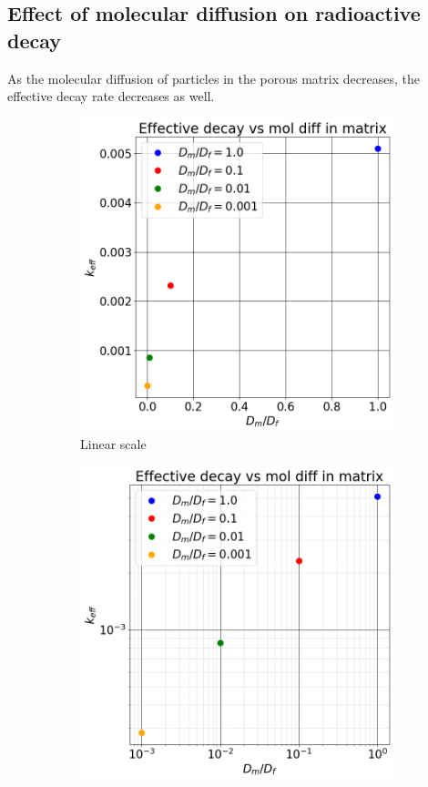 \documentclass{article}
\begin{document}
\FloatBarrier  %
\subsection{Effect of molecular diffusion on radioactive decay}
As the molecular diffusion of particles in the porous matrix decreases, the effective decay rate decreases as well.
\begin{figure}[htbp]
    \centering
    \begin{subfigure}[b]{0.48\textwidth}
        \centering
        \includegraphics[width=\textwidth]{images/kEffVsDfDmRatio.png}
        \caption{Linear scale}
    \end{subfigure}
    \hfill
    \begin{subfigure}[b]{0.48\textwidth}
        \centering
        \includegraphics[width=\textwidth]{images/kEffVsDfDmRatioLogLog.png}

\end{subfigure}
\end{figure}
\end{document}
